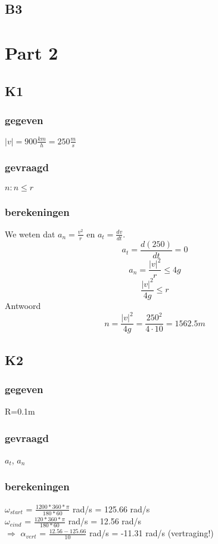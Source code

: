 \documentclass[10pt,a4paper]{article}
\begin{document}
\subsection{B3}

\section{Part 2}
\subsection{K1}
\subsubsection*{gegeven}
$|v|= 900\frac{km}{h} = 250\frac{m}{s}$
\subsubsection*{gevraagd}
$n: n \le r$
\subsubsection*{berekeningen}
We weten dat $a_n=\frac{v^2}{r}$ en $a_t = \frac{dv}{dt}$.
\[
a_t=\frac{d(250)}{dt} = 0
\]
\[
a_n = \frac{|v|^2}{r} \le 4g
\]
\[
\frac{|v|^2}{4g}\le r
\]
Antwoord
\[
n= \frac{|v|^2}{4g} = \frac{250^2}{4 \cdot 10} = 1562.5m
\]

\subsection{K2}
\subsubsection*{gegeven}
R=0.1m
\subsubsection*{gevraagd}
$a_{t}$, $a_{n}$
\subsubsection*{berekeningen}
$\omega_{start}$ = $\frac{1200*360*\pi}{180*60}$ rad/s = 125.66 rad/s\\
$\omega_{eind}$ = $\frac{120*360*\pi}{180*60}$ rad/s = 12.56 rad/s\\
$\Rightarrow$ $\alpha_{vert}$ = $\frac{12.56 - 125.66}{10}$  rad/s = -11.31 rad/s (vertraging!)\\
\end{document}
